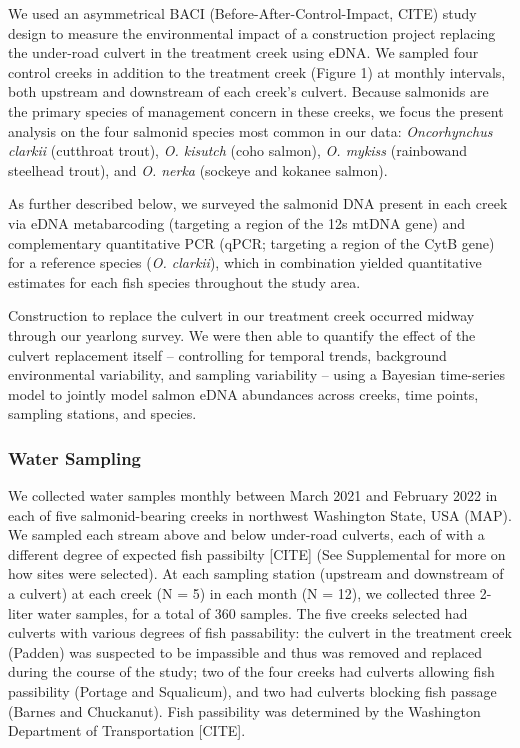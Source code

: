 \documentclass[
]{article}
\begin{document}
We used an asymmetrical BACI (Before-After-Control-Impact, CITE) study
design to measure the environmental impact of a construction project
replacing the under-road culvert in the treatment creek using eDNA. We
sampled four control creeks in addition to the treatment creek (Figure
1) at monthly intervals, both upstream and downstream of each creek's
culvert. Because salmonids are the primary species of management concern
in these creeks, we focus the present analysis on the four salmonid
species most common in our data: \emph{Oncorhynchus clarkii} (cutthroat
trout), \emph{O. kisutch} (coho salmon), \emph{O. mykiss} (rainbowand
steelhead trout), and \emph{O. nerka} (sockeye and kokanee salmon).

As further described below, we surveyed the salmonid DNA present in each
creek via eDNA metabarcoding (targeting a region of the 12s mtDNA gene)
and complementary quantitative PCR (qPCR; targeting a region of the CytB
gene) for a reference species (\emph{O. clarkii}), which in combination
yielded quantitative estimates for each fish species throughout the
study area.

Construction to replace the culvert in our treatment creek occurred
midway through our yearlong survey. We were then able to quantify the
effect of the culvert replacement itself -- controlling for temporal
trends, background environmental variability, and sampling variability
-- using a Bayesian time-series model to jointly model salmon eDNA
abundances across creeks, time points, sampling stations, and species.

\hypertarget{water-sampling}{%
\subsubsection{Water Sampling}\label{water-sampling}}

We collected water samples monthly between March 2021 and February 2022
in each of five salmonid-bearing creeks in northwest Washington State,
USA (MAP). We sampled each stream above and below under-road culverts,
each of with a different degree of expected fish passibilty {[}CITE{]}
(See Supplemental for more on how sites were selected). At each sampling
station (upstream and downstream of a culvert) at each creek (N = 5) in
each month (N = 12), we collected three 2-liter water samples, for a
total of 360 samples. The five creeks selected had culverts with various
degrees of fish passability: the culvert in the treatment creek (Padden)
was suspected to be impassible and thus was removed and replaced during
the course of the study; two of the four creeks had culverts allowing
fish passibility (Portage and Squalicum), and two had culverts blocking
fish passage (Barnes and Chuckanut). Fish passibility was determined by
the Washington Department of Transportation {[}CITE{]}.
\end{document}

